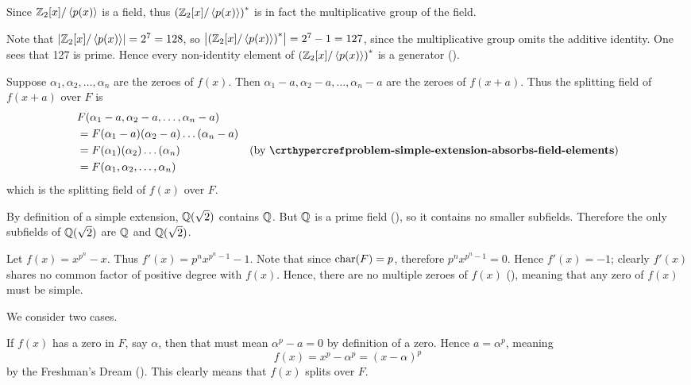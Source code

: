 \begin{questions}
\begin{partquestions}{\roman*}
        \item Since $\mathbb{Z}_2[x]/\left\langle p(x)\right\rangle$ is a field, thus $\left(\mathbb{Z}_2[x]/\left\langle p(x)\right\rangle\right)^\ast$ is in fact the multiplicative group of the field.

        \item Note that $\left|\mathbb{Z}_2[x]/\left\langle p(x)\right\rangle\right| = 2^7 = 128$, so $\left|\left(\mathbb{Z}_2[x]/\left\langle p(x)\right\rangle\right)^\ast\right| = 2^7 - 1 = 127$, since the multiplicative group omits the additive identity. One sees that 127 is prime. Hence every non-identity element of $\left(\mathbb{Z}_2[x]/\left\langle p(x)\right\rangle\right)^\ast$ is a generator ().
    \end{partquestions}

    \item Suppose $\alpha_1, \alpha_2, \dots, \alpha_n$ are the zeroes of $f(x)$. Then $\alpha_1 - a, \alpha_2 - a, \dots, \alpha_n - a$ are the zeroes of $f(x+a)$. Thus the splitting field of $f(x+a)$ over $F$ is
    \begin{align*}
        &F(\alpha_1 - a, \alpha_2 - a, \dots, \alpha_n - a)\\
        &= F(\alpha_1 - a)(\alpha_2 - a)\dots(\alpha_n - a)\\
        &= F(\alpha_1)(\alpha_2)\dots(\alpha_n) & (\text{by } \myref{problem-simple-extension-absorbs-field-elements})\\
        &= F(\alpha_1, \alpha_2, \dots, \alpha_n)
    \end{align*}
    which is the splitting field of $f(x)$ over $F$.

    \item By definition of a simple extension, $\mathbb{Q}(\sqrt2)$ contains $\mathbb{Q}$. But $\mathbb{Q}$ is a prime field (), so it contains no smaller subfields. Therefore the only subfields of $\mathbb{Q}(\sqrt2)$ are $\mathbb{Q}$ and $\mathbb{Q}(\sqrt2)$.

    \item Let $f(x) = x^{p^n} - x$. Thus $f'(x) = p^nx^{p^n-1}-1$. Note that since $\mathrm{char}(F) = p$, therefore $p^nx^{p^n-1} = 0$. Hence $f'(x) = -1$; clearly $f'(x)$ shares no common factor of positive degree with $f(x)$. Hence, there are no multiple zeroes of $f(x)$ (), meaning that any zero of $f(x)$ must be simple.

    \item We consider two cases.

    If $f(x)$ has a zero in $F$, say $\alpha$, then that must mean $\alpha^p - a = 0$ by definition of a zero. Hence $a = \alpha^p$, meaning
    \[
        f(x) = x^p - \alpha^p = (x-\alpha)^p
    \]
    by the Freshman's Dream (). This clearly means that $f(x)$ splits over $F$.


\end{questions}
